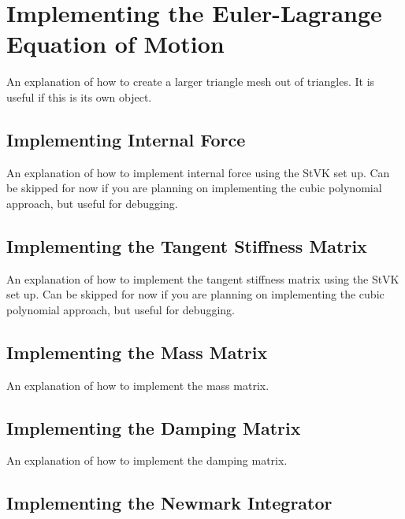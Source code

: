 \documentclass[twocolumn,10pt]{asme2ej}
\begin{document}
\section{Implementing the Euler-Lagrange Equation of Motion}

An explanation of how to create a larger triangle mesh out of triangles. It is useful if this is its own
object.

\subsection{Implementing Internal Force}

An explanation of how to implement internal force using the StVK set up. Can be skipped for now if you are
planning on implementing the cubic polynomial approach, but useful for debugging.

\subsection{Implementing the Tangent Stiffness Matrix}

An explanation of how to implement the tangent stiffness matrix using the StVK set up. Can be skipped for now if you are
planning on implementing the cubic polynomial approach, but useful for debugging.

\subsection{Implementing the Mass Matrix}

An explanation of how to implement the mass matrix.

\subsection{Implementing the Damping Matrix}

An explanation of how to implement the damping matrix.

\subsection{Implementing the Newmark Integrator}
\end{document}

